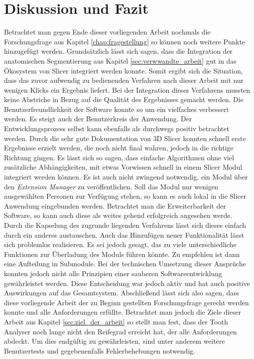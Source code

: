 \chapter{Diskussion und Fazit}
\label{chap:diskussion} Betrachtet man gegen Ende dieser vorliegenden Arbeit nochmals
die Forschungsfrage aus Kapitel \ref{chap:fragestellung} so können noch weitere Punkte
hinzugefügt werden. Grundsätzlich lässt sich sagen, dass die Integration der anatomischen
Segmentierung aus Kapitel \ref{sec:verwwandte_arbeit} gut in das Ökosystem von Slicer
integriert werden konnte. Somit ergibt sich die Situation, dass das zuvor aufwendig
zu bedienenden Verfahren nach dieser Arbeit mit nur wenigen Klicks ein Ergebnis liefert.
Bei der Integration dieses Verfahrens mussten keine Abstriche in Bezug auf die
Qualität des Ergebnisses gemacht werden. Die Benutzerfreundlichkeit der Software
konnte so um ein vielfaches verbessert werden. Es steigt auch der Benutzerkreis
der Anwendung. Der Entwicklungsprozess selbst kann ebenfalls als durchwegs positiv
betrachtet werden. Durch die sehr gute Dokumentation von 3D Slicer konnten
schnell erste Ergebnisse erzielt werden, die noch nicht final wahren, jedoch in
die richtige Richtung gingen. Es lässt sich so sagen, dass einfache Algorithmen
ohne viel zusätzliche Abhängigkeiten, mit etwas Vorwissen schnell in einem Slicer
Modul integriert werden können. Es ist auch nicht zwingend notwendig, ein Modul über
den \textit{Extension Manager} zu veröffentlichen. Soll das Modul nur wenigen ausgewählten
Personen zur Verfügung stehen, so kann es auch lokal in die Slicer Anwendung
eingebunden werden. Betrachtet man die Erweiterbarkeit der Software, so kann
auch diese als weites gehend erfolgreich angesehen werde. Durch die Kapselung des
zugrunde liegenden Verfahrens lässt sich dieses einfach durch ein anderes austauschen.
Auch das Hinzufügen neuer Funktionalität lässt sich problemlos realisieren. Es sei
jedoch gesagt, das zu viele unterschiedliche Funktionen zur Überladung des
Moduls führen könnte. Zu empfehlen ist dann eine Aufteilung in Submodule. Bei
der technischen Umsetzung dieser Ansprüche konnten jedoch nicht alle Prinzipien
einer sauberen Softwareentwicklung gewährleistet werden. Diese Entscheidung war jedoch
aktiv und hat auch positive Auswirkungen auf das Gesamtsystem. Abschließend
lässt sich also sagen, dass diese vorliegende Arbeit der zu Beginn gestellten Forschungsfrage
gerecht werden konnte und alle Anforderungen erfüllte. Betrachtet man jedoch die
Ziele dieser Arbeit aus Kapitel \ref{sec:ziel_der_arbeit} so stellt man fest, dass
der Tooth Analyser noch lange nicht den Reifegrad erreicht hat, der alle
Anforderungen abdeckt. Um dies endgültig zu gewährleisten, sind unter anderem
weitere Benutzertests und gegebenenfalls Fehlerbehebungen notwendig.
